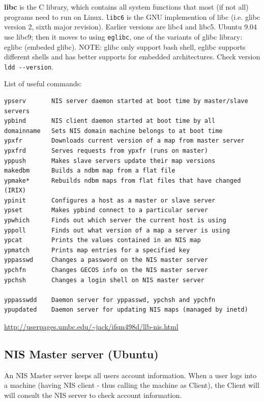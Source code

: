 \begin{framed}
{\bf libc} is the C library, which contains all system functions that most (if
not all) programs need to run on Linux. \verb!libc6! is the GNU
implemention of libc (i.e. glibc version 2, sixth
major revision). Earlier versions are libc4 and libc5. Ubuntu 9.04 use libc9;
then it moves to using  \verb!eglibc!, one of the variants of glibc library:
eglibc (embeded glibc). 
NOTE: glibc only support bash shell, eglibc supports different shells and has
better supports for embedded architectures. Check version \verb!ldd --version!.

\end{framed}



List of useful commands:
{\small \begin{verbatim}
ypserv       NIS server daemon started at boot time by master/slave servers
ypbind       NIS client daemon started at boot time by all
domainname   Sets NIS domain machine belongs to at boot time
ypxfr        Downloads current version of a map from master server
ypxfrd       Serves requests from ypxfr (runs on master)
yppush       Makes slave servers update their map versions
makedbm      Builds a ndbm map from a flat file
ypmake*      Rebuilds ndbm maps from flat files that have changed (IRIX)
ypinit       Configures a host as a master or slave server
ypset        Makes ypbind connect to a particular server
ypwhich      Finds out which server the current host is using
yppoll       Finds out what version of a map a server is using
ypcat        Prints the values contained in an NIS map
ypmatch      Prints map entries for a specified key
yppasswd     Changes a password on the NIS master server
ypchfn       Changes GECOS info on the NIS master server
ypchsh       Changes a login shell on NIS master server

yppasswdd    Daemon server for yppasswd, ypchsh and ypchfn
ypupdated    Daemon server for updating NIS maps (managed by inetd)
\end{verbatim}
}
\url{http://userpages.umbc.edu/~jack/ifsm498d/llb-nis.html}

\subsection{NIS Master server (Ubuntu)}
\label{sec:NIS_server}

An NIS Master server keeps all users account information. When a user logs into
a machine (having NIS client - thus calling the machine as Client), the Client
will will consult the NIS server to check account information. 


